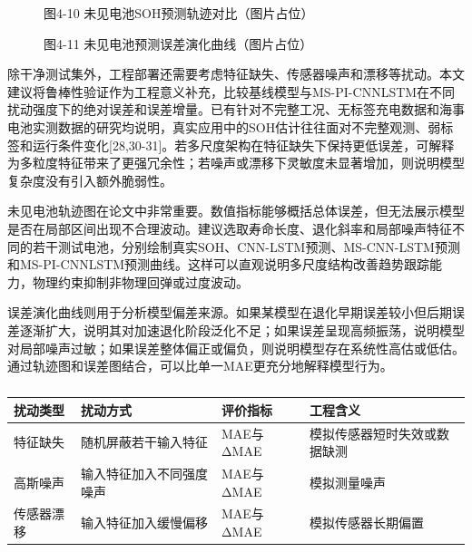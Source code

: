 \documentclass[12pt, a4paper]{ctexart}
\begin{document}
\begin{figure}[H]
  \centering
  \caption{图4-10  未见电池SOH预测轨迹对比（图片占位）}
  \label{fig:}
\end{figure}


\begin{figure}[H]
  \centering
  \caption{图4-11  未见电池预测误差演化曲线（图片占位）}
  \label{fig:}
\end{figure}

除干净测试集外，工程部署还需要考虑特征缺失、传感器噪声和漂移等扰动。本文建议将鲁棒性验证作为工程意义补充，比较基线模型与MS-PI-CNNLSTM在不同扰动强度下的绝对误差和误差增量。已有针对不完整工况、无标签充电数据和海事电池实测数据的研究均说明，真实应用中的SOH估计往往面对不完整观测、弱标签和运行条件变化[28,30-31]。若多尺度架构在特征缺失下保持更低误差，可解释为多粒度特征带来了更强冗余性；若噪声或漂移下灵敏度未显著增加，则说明模型复杂度没有引入额外脆弱性。


未见电池轨迹图在论文中非常重要。数值指标能够概括总体误差，但无法展示模型是否在局部区间出现不合理波动。建议选取寿命长度、退化斜率和局部噪声特征不同的若干测试电池，分别绘制真实SOH、CNN-LSTM预测、MS-CNN-LSTM预测和MS-PI-CNNLSTM预测曲线。这样可以直观说明多尺度结构改善趋势跟踪能力，物理约束抑制非物理回弹或过度波动。


误差演化曲线则用于分析模型偏差来源。如果某模型在退化早期误差较小但后期误差逐渐扩大，说明其对加速退化阶段泛化不足；如果误差呈现高频振荡，说明模型对局部噪声过敏；如果误差整体偏正或偏负，则说明模型存在系统性高估或低估。通过轨迹图和误差图结合，可以比单一MAE更充分地解释模型行为。




\begin{table}[H]
  \centering
  \begin{tabular}{llll}
  \toprule
  扰动类型 & 扰动方式 & 评价指标 & 工程含义 \\
  \midrule
  特征缺失 & 随机屏蔽若干输入特征 & MAE与ΔMAE & 模拟传感器短时失效或数据缺测 \\
  高斯噪声 & 输入特征加入不同强度噪声 & MAE与ΔMAE & 模拟测量噪声 \\
  传感器漂移 & 输入特征加入缓慢偏移 & MAE与ΔMAE & 模拟传感器长期偏置 \\
  \bottomrule
  \end{tabular}
  \caption{}
  \label{tab:}
\end{table}
\end{document}
